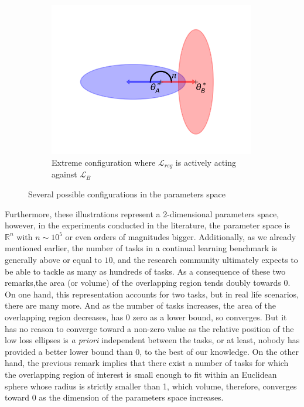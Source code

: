 \documentclass[11pt]{article}
\begin{document}
\begin{figure}
\begin{subfigure}[b]{0.3\textwidth}
        \label{fig:two_ellipses_90}
    \end{subfigure}
    \hspace{-0mm}
    \begin{subfigure}[b]{0.3\textwidth}
        \centering
        \includegraphics[width=0.99\textwidth]{images/ellipse_overlap_180.png}
        \caption{Extreme configuration where $\mathcal{L}_{reg}$ is actively acting against $\mathcal{L}_B$}
        \label{fig:two_ellipses_180}
    \end{subfigure}
    \caption{Several possible configurations in the parameters space}
    \label{fig:other_ellipses}
\end{figure}


\vspace{2mm}
\noindent
Furthermore, these illustrations represent a 2-dimensional parameters space, however, in the experiments conducted in the literature, the parameter space is $\mathbb{R}^n$ with $n \sim 10^5$ or even orders of magnitudes bigger. Additionally, as we already mentioned earlier, the number of tasks in a continual learning benchmark is generally above or equal to $10$, and the research community ultimately expects to be able to tackle as many as hundreds of tasks. As a consequence of these two remarks,the area (or volume) of the overlapping region tends doubly towards 0. On one hand, this representation accounts for two tasks, but in real life scenarios, there are many more. And as the number of tasks increases, the area of the overlapping region decreases, has 0 zero as a lower bound, so converges. But it has no reason to converge toward a non-zero value as the relative position of the low loss ellipses is \textit{a priori} independent between the tasks, or at least, nobody has provided a better lower bound than 0, to the best of our knowledge. On the other hand, the previous remark implies that there exist a number of tasks for which the overlapping region of interest is small enough to fit within an Euclidean sphere whose radius is strictly smaller than 1, which volume, therefore, converges toward 0 as the dimension of the parameters space increases. 
\end{document}

